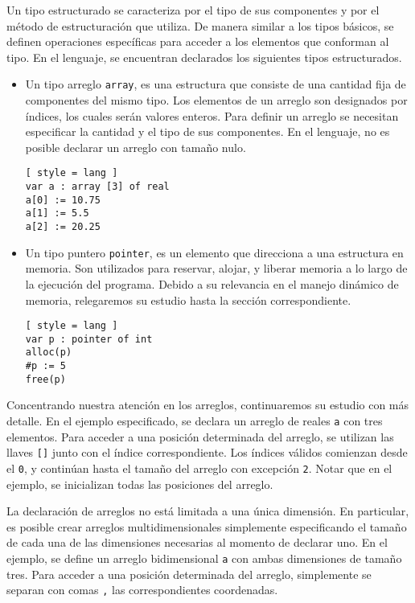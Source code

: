 Un tipo estructurado se caracteriza por el tipo de sus componentes y por el método de estructuración que utiliza.
De manera similar a los tipos básicos, se definen operaciones específicas para acceder a los elementos que conforman al tipo.
En el lenguaje, se encuentran declarados los siguientes tipos estructurados.
\begin{itemize}
\item
Un tipo arreglo \lstinline[style = lang]{array}, es una estructura que consiste de una cantidad fija de componentes del mismo tipo.
Los elementos de un arreglo son designados por índices, los cuales serán valores enteros.
Para definir un arreglo se necesitan especificar la cantidad y el tipo de sus componentes.
En el lenguaje, no es posible declarar un arreglo con tamaño nulo.
\begin{lstlisting}[ style = lang ]
var a : array [3] of real
a[0] := 10.75
a[1] := 5.5
a[2] := 20.25
\end{lstlisting}
\item
Un tipo puntero \lstinline[style = lang]{pointer}, es un elemento que direcciona a una estructura en memoria.
Son utilizados para reservar, alojar, y liberar memoria a lo largo de la ejecución del programa.
Debido a su relevancia en el manejo dinámico de memoria, relegaremos su estudio hasta la sección correspondiente.
\begin{lstlisting}[ style = lang ]
var p : pointer of int
alloc(p)
#p := 5
free(p)
\end{lstlisting}
\end{itemize}

Concentrando nuestra atención en los arreglos, continuaremos su estudio con más detalle.
En el ejemplo especificado, se declara un arreglo de reales \lstinline[style = lang]{a} con tres elementos.
Para acceder a una posición determinada del arreglo, se utilizan las llaves \lstinline[style = lang]{[]} junto con el índice correspondiente.
Los índices válidos comienzan desde el \lstinline[style = lang]{0}, y continúan hasta el tamaño del arreglo con excepción \lstinline[style = lang]{2}.
Notar que en el ejemplo, se inicializan todas las posiciones del arreglo.

La declaración de arreglos no está limitada a una única dimensión.
En particular, es posible crear arreglos multidimensionales simplemente especificando el tamaño de cada una de las dimensiones necesarias al momento de declarar uno.
En el ejemplo, se define un arreglo bidimensional \lstinline[style = lang]{a} con ambas dimensiones de tamaño tres.
Para acceder a una posición determinada del arreglo, simplemente se separan con comas \lstinline[style = lang]{,} las correspondientes coordenadas.

